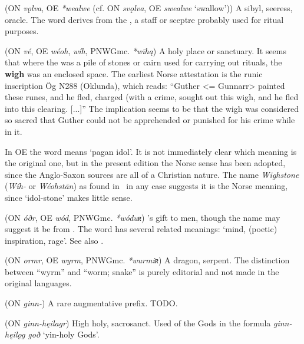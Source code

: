 \begin{itemize}
 (ON \emph{vǫlva}, OE \emph{*wealwe} (cf. ON \emph{svǫlva}, OE \emph{swealwe} ‘swallow’))
  A sibyl, seeress, oracle.  The word derives from the , a staff or sceptre probably used for ritual purposes.

 (ON \emph{vé}, OE \emph{wéoh}, \emph{wíh}, PNWGmc. \emph{*wīhą})
  A holy place or sanctuary. It seems that where the  was a pile of stones or cairn used for carrying out rituals, the \textbf{wigh} was an enclosed space. The earliest Norse attestation is the runic inscription Ög N288 (Oklunda), which reads: “Guther <= Gunnarr> painted these runes, and he fled, charged (with a crime, sought out this wigh, and he fled into this clearing. [...]” The implication seems to be that the wigh was considered so sacred that Guther could not be apprehended or punished for his crime while in it.

  In OE the word means ‘pagan idol’. It is not immediately clear which meaning is the original one, but in the present edition the Norse sense has been adopted, since the Anglo-Saxon sources are all of a Christian nature.  The name \emph{Wighstone} (\emph{Wíh-} or \emph{Wéohstān}) as found in \Beowulf\ in any case suggests it is the Norse meaning, since ‘idol-stone’ makes little sense.

 (ON \emph{óðr}, OE \emph{wód}, PNWGmc. \emph{*wóduʀ})
  ’s gift to men, though the name may suggest it be from . The word has several related meanings: ‘mind, (poetic) inspiration, rage’. See also .

 (ON \emph{ormr}, OE \emph{wyrm}, PNWGmc. \emph{*wurmiʀ})
  A dragon, serpent.  The distinction between “wyrm” and “worm; snake” is purely editorial and not made in the original languages.

 (ON \emph{ginn-})
  A rare augmentative prefix. TODO.

 (ON \emph{ginn-hęilagr})
  High holy, sacrosanct.  Used of the Gods in the formula \emph{ginn-hęilǫg goð} ‘yin-holy Gods’.

\end{itemize}

